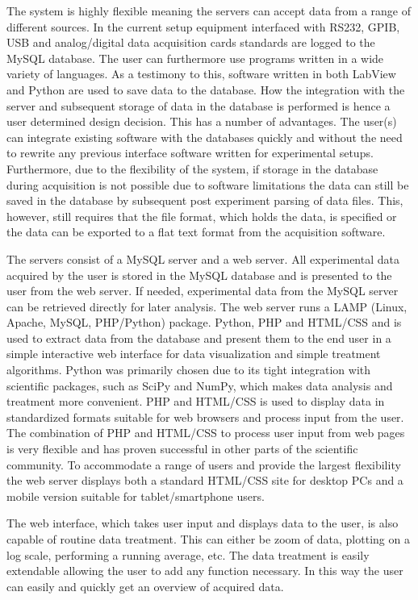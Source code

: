 The system is highly flexible meaning the servers can accept data from a range
of different sources. In the current setup equipment interfaced with RS232,
GPIB, USB and analog/digital data acquisition cards standards are logged to the
MySQL database. The user can furthermore use programs written in a wide variety
of languages. As a testimony to this, software written in both LabView and
Python\cite{python} are used to save data to the database. How the integration
with the server and subsequent storage of data in the database is performed is
hence a user determined design decision. This has a number of advantages.  The
user(s) can integrate existing software with the databases quickly and without
the need to rewrite any previous interface software written for experimental
setups. Furthermore, due to the flexibility of the system, if storage in the
database during acquisition is not possible due to software limitations the
data can still be saved in the database by subsequent post experiment parsing
of data files. This, however, still requires that the file format, which holds
the data, is specified or the data can be exported to a flat text format from
the acquisition software.

The servers consist of a MySQL server and a web server. All experimental data
acquired by the user is stored in the MySQL database and is presented to the
user from the web server. If needed, experimental data from the MySQL server
can be retrieved directly for later analysis. The web server runs a LAMP
(Linux, Apache, MySQL, PHP/Python) package. Python, PHP and HTML/CSS and is
used to extract data from the database and present them to the end user in a
simple interactive web interface for data visualization and simple treatment
algorithms. Python was primarily chosen due to its tight integration with
scientific packages, such as SciPy and NumPy, which makes data analysis and
treatment more convenient\cite{Cahn2007}. PHP and HTML/CSS is used to display
data in standardized formats suitable for web browsers and process input from
the user. The combination of PHP and HTML/CSS to process user input from web
pages is very flexible and has proven successful in other parts of the
scientific community\cite{Crane2008}. To accommodate a range of users and
provide the largest flexibility the web server displays both a standard HTML/CSS
site for desktop PCs and a mobile version suitable for tablet/smartphone users.


The web interface, which takes user input and displays data to the user, is also
capable of routine data treatment. This can either be zoom of data, plotting on
a log scale, performing a running average, etc. The data treatment is easily
extendable allowing the user to add any function necessary. In this way the
user can easily and quickly get an overview of acquired data.
